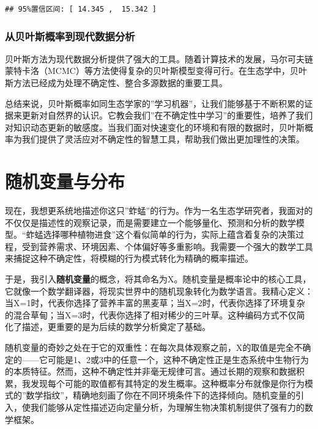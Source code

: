 \documentclass[
]{book}
\begin{document}
\begin{verbatim}
## 95%置信区间: [ 14.345 ,  15.342 ]
\end{verbatim}

\hypertarget{ux4eceux8d1dux53f6ux65afux6982ux7387ux5230ux73b0ux4ee3ux6570ux636eux5206ux6790}{%
\subsubsection{从贝叶斯概率到现代数据分析}\label{ux4eceux8d1dux53f6ux65afux6982ux7387ux5230ux73b0ux4ee3ux6570ux636eux5206ux6790}}

贝叶斯方法为现代数据分析提供了强大的工具。随着计算技术的发展，马尔可夫链蒙特卡洛（MCMC）等方法使得复杂的贝叶斯模型变得可行。在生态学中，贝叶斯方法已经成为处理不确定性、整合多源数据的重要工具。

总结来说，贝叶斯概率如同生态学家的''学习机器''，让我们能够基于不断积累的证据来更新对自然界的认识。它教会我们''在不确定性中学习''的重要性，培养了我们对知识动态更新的敏感度。当我们面对快速变化的环境和有限的数据时，贝叶斯概率为我们提供了灵活应对不确定性的智慧工具，帮助我们做出更加理性的决策。

\hypertarget{ux968fux673aux53d8ux91cfux4e0eux5206ux5e03}{%
\section{随机变量与分布}\label{ux968fux673aux53d8ux91cfux4e0eux5206ux5e03}}

现在，我想更系统地描述你这只''蚱蜢''的行为。作为一名生态学研究者，我面对的不仅仅是描述性的观察记录，而是需要建立一个能够量化、预测和分析的数学模型。``蚱蜢选择哪种植物进食''这个看似简单的行为，实际上蕴含着复杂的决策过程，受到营养需求、环境因素、个体偏好等多重影响。我需要一个强大的数学工具来捕捉这种不确定性，将模糊的行为模式转化为精确的概率描述。

于是，我引入\textbf{随机变量}的概念，将其命名为X。随机变量是概率论中的核心工具，它就像一个数学翻译器，将现实世界中的随机现象转化为数学语言。我精心定义：当X=1时，代表你选择了营养丰富的黑麦草；当X=2时，代表你选择了环境复杂的混合草甸；当X=3时，代表你选择了相对稀少的三叶草。这种编码方式不仅简化了描述，更重要的是为后续的数学分析奠定了基础。

随机变量的奇妙之处在于它的双重性：在每次具体观察之前，X的取值是完全不确定的------它可能是1、2或3中的任意一个，这种不确定性正是生态系统中生物行为的本质特征。然而，这种不确定性并非毫无规律可言。通过长期的观察和数据积累，我发现每个可能的取值都有其特定的发生概率。这种概率分布就像是你行为模式的''数学指纹''，精确地刻画了你在不同环境条件下的选择倾向。随机变量的引入，使我们能够从定性描述迈向定量分析，为理解生物决策机制提供了强有力的数学框架。
\end{document}
